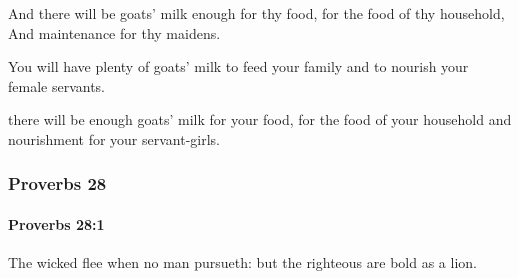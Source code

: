 			\begin{versebox}
					\item[BHS] 
					\item[ASV] And there will be goats' milk enough for thy food, for the food of thy household, And maintenance for thy maidens.
					\item[NIV] You will have plenty of goats’ milk to feed your family and to nourish your female servants.
					\item[NRSV] there will be enough goats’ milk for your food, for the food of your household and nourishment for your servant-girls.
			\end{versebox}
	\subsubsection{Proverbs 28} %
		\label{PROVERBS-28}

		\paragraph{Proverbs 28:1} %
			\label{PROVERBS-28-1}

			The wicked flee when no man pursueth: but the righteous are bold as a lion.

